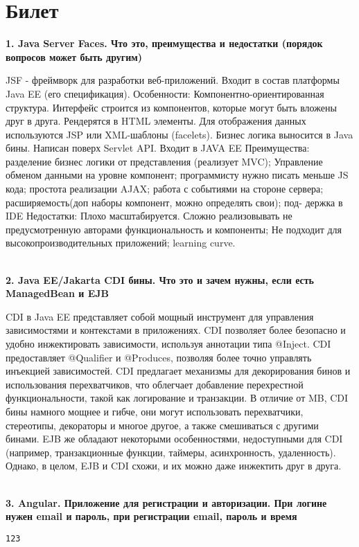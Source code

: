 \documentclass{article}
\newcommand{\bil}[5]{%
        \section{Билет}
        \textbf{1. #1}

        #4
        \\
        \textbf{2. #2}
        
        #5
        \\
        \textbf{3. #3}
}
\begin{document}
\bil{Java Server Faces. Что это, преимущества и недостатки (порядок вопросов может быть другим)}
{Java EE/Jakarta CDI бины. Что это и зачем нужны, если есть ManagedBean и EJB}
{Angular. Приложение для регистрации и авторизации. При логине нужен email и пароль, при регистрации email, пароль и время}{
    JSF - фреймворк для разработки веб-приложений. Входит в состав платформы Java EE (его спецификация). 
    Особенности: Компонентно-ориентированная структура. 
    Интерфейс строится из компонентов, которые могут быть вложены друг в друга. 
    Рендерятся в HTML элементы. Для отображения данных используются JSP или XML-шаблоны (facelets). 
    Бизнес логика выносится в Java бины. Написан поверх Servlet API. 
    Входит в JAVA EE Преимущества: разделение бизнес логики от представления (реализует MVC); Управление обменом данными на уровне компонент; программисту нужно писать меньше JS кода; простота реализации AJAX; работа с событиями на стороне сервера; расширяемость(доп наборы компонент, можно определять свои); под- держка в IDE Недостатки: Плохо масштабируется. 
    Сложно реализовывать не предусмотренную авторами функциональность и компоненты; Не подходит для высокопроизводительных приложений; learning curve.
}{
    CDI в Java EE представляет собой мощный инструмент для управления зависимостями и контекстами в приложениях. 
    CDI позволяет более безопасно и удобно инжектировать зависимости, используя аннотации типа @Inject.
    CDI предоставляет @Qualifier и @Produces, позволяя более точно управлять инъекцией зависимостей.
    CDI предлагает механизмы для декорирования бинов и использования перехватчиков, что облегчает добавление перехрестной функциональности, такой как логирование и транзакции.
    В отличие от MB, CDI бины намного мощнее и гибче, они могут использовать перехватчики, стереотипы, декораторы и многое другое, а также смешиваться с другими бинами. EJB же обладают некоторыми особенностями, недоступными для CDI (например, транзакционные функции, таймеры, асинхронность, удаленность). Однако, в целом, EJB и CDI схожи, и их можно даже инжектить друг в друга.
}
\begin{lstlisting}[frame=single, basicstyle=\ttfamily, breaklines=true, breakatwhitespace=true, postbreak=\mbox{\textcolor{red}{$\hookrightarrow$}\space}]
123
\end{lstlisting}
\end{document}
